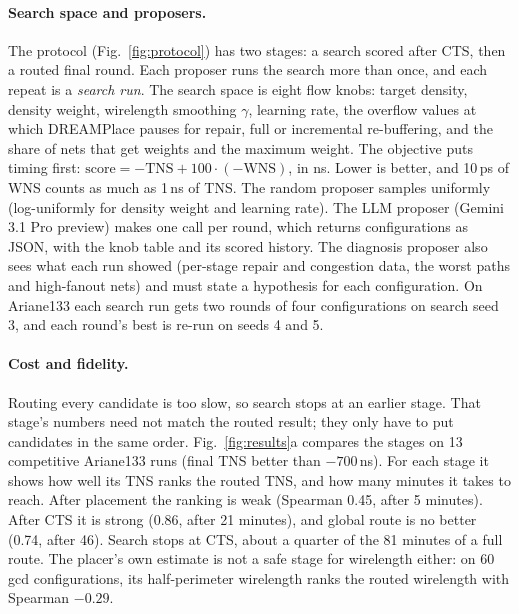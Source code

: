 \documentclass[sigconf]{acmart}
\begin{document}
\paragraph{Search space and proposers.}
The protocol (Fig.~\ref{fig:protocol}) has two stages: a search scored after
CTS, then a routed final round. Each proposer runs the search
more than once, and each repeat is a \emph{search run}. The search space is eight
flow knobs:
target density, density weight, wirelength smoothing $\gamma$, learning rate,
the overflow values at which DREAMPlace pauses for repair, full or incremental
re-buffering, and the share of nets that get weights and the maximum weight. The objective puts timing first:
$\mathrm{score} = -\mathrm{TNS} + 100\cdot(-\mathrm{WNS})$, in ns. Lower is
better, and 10\,ps of WNS counts as much as 1\,ns of TNS. The random proposer samples uniformly (log-uniformly for density
weight and learning rate). The LLM proposer (Gemini 3.1 Pro preview) makes one
call per round, which returns configurations as JSON, with the knob table and
its scored history. The
diagnosis proposer also sees what each run showed (per-stage repair and congestion
data, the worst paths and high-fanout nets) and must state a hypothesis for
each configuration. On Ariane133 each search run gets two rounds of four
configurations on search seed 3, and each round's best is re-run on seeds 4
and 5.

\paragraph{Cost and fidelity.}
Routing every candidate is too slow, so search stops at an earlier stage. That
stage's numbers need not match the routed result; they only have to put
candidates in the same order.
Fig.~\ref{fig:results}a compares the stages on 13 competitive Ariane133 runs
(final TNS better than $-700$\,ns). For each stage it shows how well its TNS
ranks the routed TNS, and how many minutes it takes to reach. After placement the ranking is weak
(Spearman 0.45, after 5 minutes). After CTS it is strong (0.86, after 21
minutes), and global route is no better (0.74, after 46). Search stops at CTS,
about a quarter of the 81 minutes of a full route. The placer's own estimate
is not a safe stage for wirelength either: on 60 gcd configurations, its
half-perimeter wirelength ranks the routed wirelength with Spearman $-0.29$.
\end{document}
